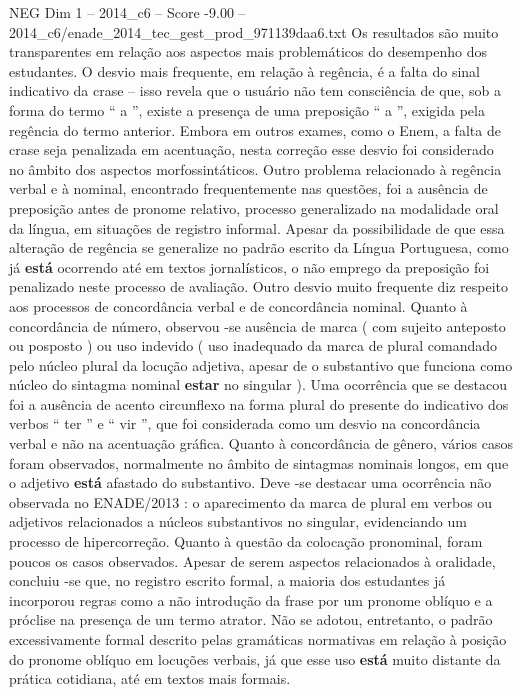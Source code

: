\begin{textsample}{NEG Dim 1 – 2014\_c6 – Score -9.00 – 2014\_c6/enade\_2014\_tec\_gest\_prod\_971139daa6.txt}
Os resultados são muito transparentes em relação aos aspectos mais problemáticos do desempenho dos estudantes.
O desvio mais frequente, em relação à regência, é a falta do sinal indicativo da crase – isso revela que o usuário não tem consciência de que, sob a forma do termo “ a ”, existe a presença de uma preposição “ a ”, exigida pela regência do termo anterior.
Embora em outros exames, como o Enem, a falta de crase seja penalizada em acentuação, nesta correção esse desvio foi considerado no âmbito dos aspectos morfossintáticos.
Outro problema relacionado à regência verbal e à nominal, encontrado frequentemente nas questões, foi a ausência de preposição antes de pronome relativo, processo generalizado na modalidade oral da língua, em situações de registro informal.
Apesar da possibilidade de que essa alteração de regência se generalize no padrão escrito da Língua Portuguesa, como já \textbf{está} ocorrendo até em textos jornalísticos, o não emprego da preposição foi penalizado neste processo de avaliação.
Outro desvio muito frequente diz respeito aos processos de concordância verbal e de concordância nominal.
Quanto à concordância de número, observou -se ausência de marca ( com sujeito anteposto ou posposto ) ou uso indevido ( uso inadequado da marca de plural comandado pelo núcleo plural da locução adjetiva, apesar de o substantivo que funciona como núcleo do sintagma nominal \textbf{estar} no singular ).
Uma ocorrência que se destacou foi a ausência de acento circunflexo na forma plural do presente do indicativo dos verbos “ ter ” e “ vir ”, que foi considerada como um desvio na concordância verbal e não na acentuação gráfica.
Quanto à concordância de gênero, vários casos foram observados, normalmente no âmbito de sintagmas nominais longos, em que o adjetivo \textbf{está} afastado do substantivo.
Deve -se destacar uma ocorrência não observada no ENADE/2013 : o aparecimento da marca de plural em verbos ou adjetivos relacionados a núcleos substantivos no singular, evidenciando um processo de hipercorreção.
Quanto à questão da colocação pronominal, foram poucos os casos observados.
Apesar de serem aspectos relacionados à oralidade, concluiu -se que, no registro escrito formal, a maioria dos estudantes já incorporou regras como a não introdução da frase por um pronome oblíquo e a próclise na presença de um termo atrator.
Não se adotou, entretanto, o padrão excessivamente formal descrito pelas gramáticas normativas em relação à posição do pronome oblíquo em locuções verbais, já que esse uso \textbf{está} muito distante da prática cotidiana, até em textos mais formais.

\end{textsample}
